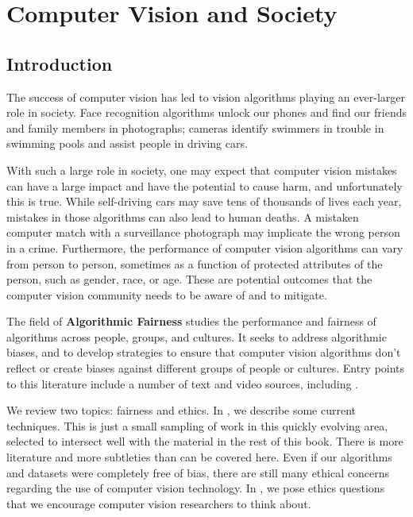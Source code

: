 \chapter{Computer Vision and Society}
\label{chapter:computer_vision_and_society}


\section{Introduction}

The success of computer vision has led to vision algorithms playing an
ever-larger role in society. Face recognition algorithms unlock
our phones and find our friends and family members in photographs;  cameras identify
swimmers in trouble in swimming pools and assist people in driving
cars.

With such a large role in society, one may expect that computer vision mistakes can
have a large impact and have the potential to cause harm, and
unfortunately this is true.  While self-driving cars may save tens of
thousands of lives each year, mistakes in those algorithms can also
lead to human deaths.  A mistaken computer match with a surveillance
photograph may implicate the wrong person in a crime.  Furthermore,
the performance of computer vision algorithms can vary from person to
person, sometimes as a function of protected attributes of the person, such as gender, race, or age.
These are potential outcomes that
the computer vision community needs to be aware of and to
mitigate.

The field of {\bf Algorithmic Fairness} studies the performance and fairness
of algorithms across people, groups, and cultures.  It seeks to
address algorithmic biases, and to develop strategies to ensure that computer vision algorithms don't reflect or create biases against different groups of people or cultures.
Entry points to this literature include a number of text and video sources, including \cite{Kearns2020,Gebru2020,Hamidi2018,Garvie2016,Hutchinson2019,Dwork2012,barocas-hardt-narayanan,Hardt2020}.

We review two topics: fairness and ethics.
In \sect{\ref{sect:fairness}}, we describe some current techniques.  This is just a small sampling of work in this quickly evolving area, selected to intersect well with the material in the rest of this book.  There is more literature and more subtleties than can be covered here. Even if our algorithms and datasets were completely free of bias, there are still many ethical concerns regarding the use of computer vision technology.
In \sect{\ref{sect:ethics}}, we pose ethics questions that we encourage computer vision researchers to think about.


